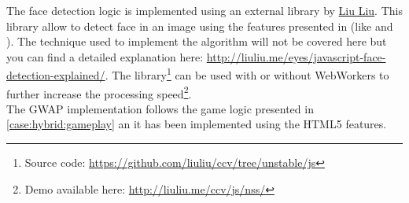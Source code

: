 The face detection logic is implemented using an external library by
\href{http://liuliu.me/}{Liu Liu}. This library allow to detect face in an image
using the \js{} features presented in (like  and ).
The technique used to implement the algorithm will not be covered here but you
can find a detailed explanation here:
\url{http://liuliu.me/eyes/javascript-face-detection-explained/}.
The library\footnote{Source code: \url{https://github.com/liuliu/ccv/tree/unstable/js}}
can be used with or without WebWorkers to further increase the processing
speed\footnote{Demo available here: \url{http://liuliu.me/ccv/js/nss/}}.\\

The \ac{GWAP} implementation follows the game logic presented in
\ref{case:hybrid:gameplay} an it has been implemented using the \ac{HTML}5
features.
